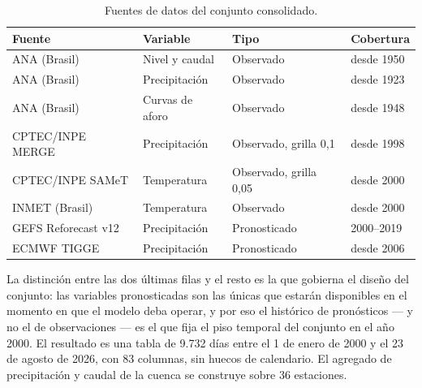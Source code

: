 \begin{table}[H]
  \centering
  \caption{Fuentes de datos del conjunto consolidado.}
  \label{tab:fuentes}
  \small
  \begin{tabular}{@{}llll@{}}
    \toprule
    \textbf{Fuente} & \textbf{Variable} & \textbf{Tipo} & \textbf{Cobertura} \\
    \midrule
    ANA (Brasil)        & Nivel y caudal      & Observado   & desde 1950 \\
    ANA (Brasil)        & Precipitación       & Observado   & desde 1923 \\
    ANA (Brasil)        & Curvas de aforo     & Observado   & desde 1948 \\
    CPTEC/INPE MERGE    & Precipitación       & Observado, grilla 0,1\textdegree{} & desde 1998 \\
    CPTEC/INPE SAMeT    & Temperatura         & Observado, grilla 0,05\textdegree{} & desde 2000 \\
    INMET (Brasil)      & Temperatura         & Observado   & desde 2000 \\
    GEFS Reforecast v12 & Precipitación       & Pronosticado & 2000--2019 \\
    ECMWF TIGGE         & Precipitación       & Pronosticado & desde 2006 \\
    \bottomrule
  \end{tabular}
\end{table}

La distinción entre las dos últimas filas y el resto es la que gobierna el diseño del conjunto: las
variables pronosticadas son las únicas que estarán disponibles en el momento en que el modelo deba
operar, y por eso el histórico de pronósticos --- y no el de observaciones --- es el que fija el
piso temporal del conjunto en el año 2000.
El resultado es una tabla de 9.732 días entre el 1 de enero de 2000 y el 23 de agosto de 2026, con
83 columnas, sin huecos de calendario.
El agregado de precipitación y caudal de la cuenca se construye sobre 36 estaciones.


